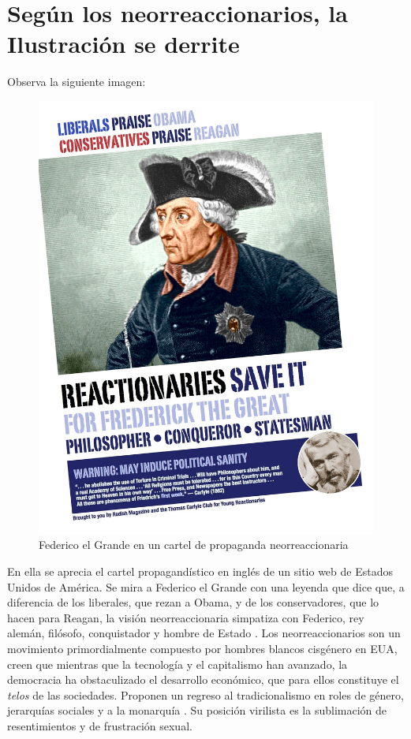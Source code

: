 \section{Según los neorreaccionarios, la Ilustración se derrite}
\label{sec:según-los-neorreaccionarios}

Observa la siguiente imagen:

\begin{figure}[!ht]
  \centering
  \includegraphics[width=0.7\linewidth]{images/carlyle-neorreactionaries.png}
  \caption{Federico el Grande en un cartel de propaganda neorreaccionaria}
  \label{fig:federico}
\end{figure}

En ella se aprecia el cartel propagandístico en inglés de un sitio web de Estados Unidos de América. Se mira a Federico el Grande con una leyenda que dice que, a diferencia de los liberales, que rezan a Obama, y de los conservadores, que lo hacen para Reagan, la visión neorreaccionaria simpatiza con Federico, rey alemán, filósofo, conquistador y hombre de Estado \autocite{huiUnhappyConsciousnessNeoreactionaries2017}. Los neorreaccionarios son un movimiento primordialmente compuesto por hombres blancos cisgénero en EUA, creen que mientras que la tecnología y el capitalismo han avanzado, la democracia ha obstaculizado el desarrollo económico, que para ellos constituye el \emph{telos} de las sociedades. Proponen un regreso al tradicionalismo en roles de género, jerarquías sociales y a la monarquía \autocite{AskphilosophyWhatNeoreactionarism}. Su posición virilista es la sublimación de resentimientos y de frustración sexual.

